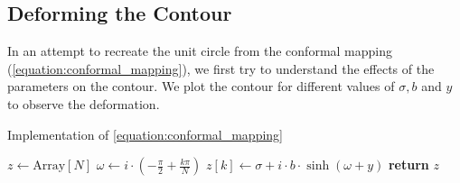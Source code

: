 \documentclass[a4paper]{report}
\begin{document}
\subsection{Deforming the Contour}\label{section:deforming_contour}
In an attempt to recreate the unit circle from the conformal mapping (\autoref{equation:conformal_mapping}), we first try to understand the effects of the parameters on the contour.  We plot the contour for different values of $\sigma, b$ and $y$ to observe the deformation.

\begin{algorithm}[H]
\caption{Implementation of \autoref{equation:conformal_mapping}}
\label{algo:hyperbolic_sine}
\begin{algorithmic}[1]
\State $z \gets \text{Array}[N]$ 
\State $\omega \gets i \cdot (-\frac{\pi}{2} + \frac{k\pi}{N})$
\State $z[k] \gets \sigma + i \cdot b \cdot \sinh(\omega + y)$
\EndFor
\State \textbf{return} $z$
\EndProcedure
\end{algorithmic}
\end{algorithm}
\end{document}
